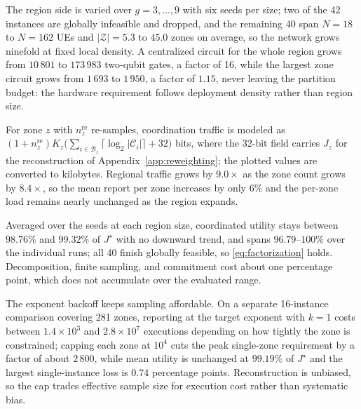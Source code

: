 \documentclass[journal]{IEEEtran}
\begin{document}
{The region side is varied over $g=3,\ldots,9$ with six seeds per size; two of the 42 instances are globally infeasible and dropped, and the remaining 40 span $N=18$ to $N=162$ UEs and $|\mathcal{Z}|=5.3$ to $45.0$ zones on average, so the network grows ninefold at fixed local density. A centralized circuit for the whole region grows from $10\,801$ to $173\,983$ two-qubit gates, a factor of 16, while the largest zone circuit grows from $1\,693$ to $1\,950$, a factor of $1.15$, never leaving the partition budget: the hardware requirement follows deployment density rather than region size.

For zone $z$ with $n_z^{\mathrm{re}}$ re-samples, coordination traffic is modeled as $(1+n_z^{\mathrm{re}})K_z\bigl(\sum_{i\in\mathcal{B}_z}\lceil\log_2|\mathcal{C}_i|\rceil+32\bigr)$ bits, where the 32-bit field carries $J_z$ for the reconstruction of Appendix~\ref{app:reweighting}; the plotted values are converted to kilobytes. Regional traffic grows by $9.0\times$ as the zone count grows by $8.4\times$, so the mean report per zone increases by only $6\%$ and the per-zone load remains nearly unchanged as the region expands.

Averaged over the seeds at each region size, coordinated utility stays between $98.76\%$ and $99.32\%$ of $J^{\star}$ with no downward trend, and spans $96.79$--$100\%$ over the individual runs; all 40 finish globally feasible, so \eqref{eq:factorization} holds. Decomposition, finite sampling, and commitment cost about one percentage point, which does not accumulate over the evaluated range.

The exponent backoff keeps sampling affordable. On a separate 16-instance comparison covering 281 zones, reporting at the target exponent with $k=1$ costs between $1.4\times10^3$ and $2.8\times10^7$ executions depending on how tightly the zone is constrained; capping each zone at $10^4$ cuts the peak single-zone requirement by a factor of about $2\,800$, while mean utility is unchanged at $99.19\%$ of $J^{\star}$ and the largest single-instance loss is $0.74$ percentage points. Reconstruction is unbiased, so the cap trades effective sample size for execution cost rather than systematic bias.
}
\end{document}
